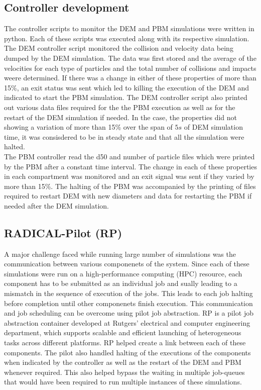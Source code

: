 \documentclass[fleqn,twoside,10pt]{article}
\begin{document}
\subsection{Controller development}
The controller scripts to monitor the DEM and PBM simulations were written in python. Each of these 
scripts was executed along with its respective simulation. The DEM controller script monitored the 
collision and velocity data being dumped by the DEM simulation. The data was first stored and the 
average of the velocities for each type of particles and the total number of collisions and impacts 
weere determined. If there was a change in either of these properties of more than 15\%, an exit 
status was sent which led to killing the execution of the DEM and indicated to start the PBM 
simulation. The DEM controller script also printed out various data files required for the the PBM 
execution as well as for the restart of the DEM simulation if needed. In the case, the properties did  
not showing a variation of more than 15\% over the span of $5s$ of DEM simulation time, it was 
consisdered to be in steady state and that all the simulation were halted.\\
The PBM controller read the d50 and number of particle files which were printed by the PBM after a 
constant time interval. The change in each of these properties in each compartment was monitored 
and an exit signal was sent if they varied by more than 15\%. The halting of the PBM was accompanied 
by the printing of files required to restart DEM with new diameters and data for restarting the PBM 
if needed after the DEM simulation.  

\subsection{RADICAL-Pilot (RP)}
A major challenge faced while running large number of simulations was the communication between 
various componenets of the system. Since each of these simulations were run on a high-performance 
computing (HPC) resource, each component has to be submitted as an individual job and sually leading 
to a mismatch in the sequence of execution of the jobs. This leads to each job halting before 
completion until other componenets finish execution. This communication and job scheduling can be 
overcome using pilot job abstraction. RP is a pilot job abstraction container developed at Rutgers' 
electrical and computer engineering department, which supports scalable and efficient launching of 
heterogeneous tasks across different platforms. RP helped create a link between each of these 
components. The pilot also handled halting of the executions of the components when indicated by the 
controller as well as the restart of the DEM and PBM whenever required. This also helped bypass the 
waiting in multiple job-queues that would have been required to run multiple instances of these simulations.
\end{document}
